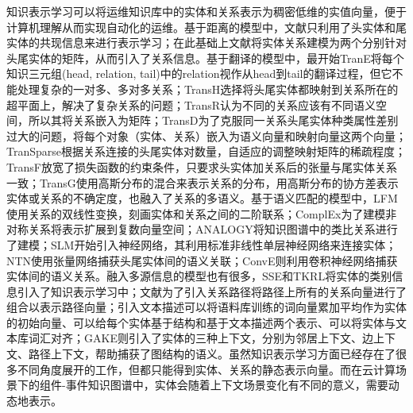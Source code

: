 知识表示学习可以将运维知识库中的实体和关系表示为稠密低维的实值向量，便于计算机理解从而实现自动化的运维。基于距离的模型中，文献\parencite{bordes2012joint}只利用了头实体和尾实体的共现信息来进行表示学习；在此基础上文献\parencite{bordes2011learning}将实体关系建模为两个分别针对头尾实体的矩阵，从而引入了关系信息。基于翻译的模型中，最开始TranE\cite{bordes2013translatingE}将每个知识三元组(head, relation, tail)中的relation视作从head到tail的翻译过程，但它不能处理复杂的一对多、多对多关系；TransH\cite{wang2014knowledge}选择将头尾实体都映射到关系所在的超平面上，解决了复杂关系的问题；TransR\cite{lin2015learning}认为不同的关系应该有不同语义空间，所以其将关系嵌入为矩阵；TransD\cite{ji2015knowledge}为了克服同一关系头尾实体种类属性差别过大的问题，将每个对象（实体、关系）嵌入为语义向量和映射向量这两个向量；TranSparse\cite{ji2016knowledge}根据关系连接的头尾实体对数量，自适应的调整映射矩阵的稀疏程度；TransF\cite{feng2016knowledge}放宽了损失函数的约束条件，只要求头实体加关系后的张量与尾实体关系一致；TransG\cite{ou2016asymmetric}使用高斯分布的混合来表示关系的分布，用高斯分布的协方差表示实体或关系的不确定度，也融入了关系的多语义。基于语义匹配的模型中，LFM\cite{jenatton2012latent}使用关系的双线性变换，刻画实体和关系之间的二阶联系；ComplEx\cite{trouillon2016complex}为了建模非对称关系将表示扩展到复数向量空间；ANALOGY\cite{liu2017analogical}将知识图谱中的类比关系进行了建模；SLM\cite{socher2013reasoning}开始引入神经网络，其利用标准非线性单层神经网络来连接实体；NTN\cite{socher2013reasoning}使用张量网络捕获头尾实体间的语义关联；ConvE\cite{dettmers2018convolutional}则利用卷积神经网络捕获实体间的语义关系。融入多源信息的模型也有很多，SSE\cite{guo2015semantically}和TKRL\cite{xie2016representation}将实体的类别信息引入了知识表示学习中；文献\parencite{lin2015modeling}为了引入关系路径将路径上所有的关系向量进行了组合以表示路径向量；引入文本描述可以将语料库训练的词向量累加平均作为实体的初始向量\cite{socher2013reasoning}、可以给每个实体基于结构和基于文本描述两个表示\cite{xie2016representation}、可以将实体与文本库词汇对齐\cite{wang2016text}；GAKE\cite{feng2016gake}则引入了实体的三种上下文，分别为邻居上下文、边上下文、路径上下文，帮助捕获了图结构的语义。虽然知识表示学习方面已经存在了很多不同角度展开的工作，但都只能得到实体、关系的静态表示向量。而在云计算场景下的组件-事件知识图谱中，实体会随着上下文场景变化有不同的意义，需要动态地表示。

